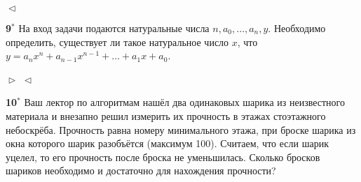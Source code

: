 \documentclass{article}
\begin{document}
$\vartriangleleft$

\medskip

\textbf{9$^*$} На вход задачи подаются натуральные числа $n, a_0, \dots, a_n, y$. Необходимо определить, существует ли такое натуральное число $x$, что $y = a_n x^n + a_{n-1} x^{n-1} + \dots + a_1 x + a_0$.

$\vartriangleright$
$\vartriangleleft$
\medskip

\textbf{10$^*$} Ваш лектор по алгоритмам нашёл два одинаковых шарика из неизвестного материала и внезапно решил измерить их прочность в этажах стоэтажного небоскрёба. Прочность равна номеру минимального этажа, при броске шарика из окна которого шарик
разобъётся (максимум 100). Считаем, что если шарик уцелел, то его прочность после броска не уменьшилась. Сколько бросков шариков необходимо и достаточно для нахождения прочности?
\end{document}
